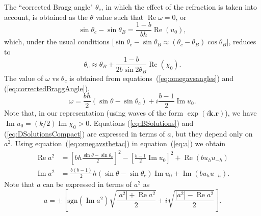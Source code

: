\documentclass{iucr}
\begin{document}
The ``corrected Bragg angle" $\theta_c$, in which the effect of the refraction is taken into account, is obtained as the $\theta$ value such that $\operatorname{Re} \omega=0$, or
\begin{equation}\label{eq:correctedBraggAngleExact}
   \sin\theta_c - \sin\theta_B = \frac{1-b}{b h} \operatorname{Re}(u_0),  
\end{equation}
which, under the usual conditions [$\sin\theta_c-\sin\theta_B \approx  (\theta_c-\theta_B) \cos\theta_B$], reduces to
\begin{equation}\label{eq:correctedBraggAngle}
   \theta_c \approx \theta_B + \frac{1-b}{2 b \sin2\theta_B} \operatorname{Re}(\chi_0).  
\end{equation}
The value of $\omega$ vs $\theta_c$ is obtained from equations~(\ref{eq:omegavsangles}) and (\ref{eq:correctedBraggAngle}),
\begin{equation}\label{eq:omegavsthetac}
    \omega=\frac{b h}{2} (\sin\theta-\sin\theta_c) + i \frac{b-1}{2} \operatorname{Im}u_0.
\end{equation}
Note that, in our representation (using waves of the form $\exp(i\textbf{k}.\textbf{r})$), we have $\operatorname{Im}u_0=(k/2)\operatorname{Im}\chi_0>0$.
Equations (\ref{eq:BSolutions}) and (\ref{eq:DSolutionsCompact}) are expressed in terms of $a$, but they depend only on $a^2$. 
Using equation~(\ref{eq:omegavsthetac}) in equation~(\ref{eq:a}) we obtain
\begin{subequations}\label{eq:avsthetac}
\begin{align}
\operatorname{Re}a^2&=\left[ bh
\frac{\sin\theta-\sin\theta_c}{2}
\right]^2 - \left[ \frac{b-1}{2}\operatorname{Im}u_0 \right]^2 + \operatorname{Re}(b u_h u_{-h})  \\
\operatorname{Im}a^2 &= \frac{b(b-1)}{2} h  (\sin\theta-\sin\theta_c) \operatorname{Im}u_0 + \operatorname{Im} (b u_h u_{-h}). 
\end{align}
\end{subequations}
Note that $a$ can be expressed in terms of $a^2$ as
\begin{equation}\label{eq:asigned}
    a = \pm \left[ \text{sgn}(\operatorname{Im}a^2)\sqrt{\frac{|a^2| + \operatorname{Re} a^2}{2}} + i \sqrt{\frac{|a^2|-\operatorname{Re}a^2}{2}} \right].
\end{equation}
\end{document}
